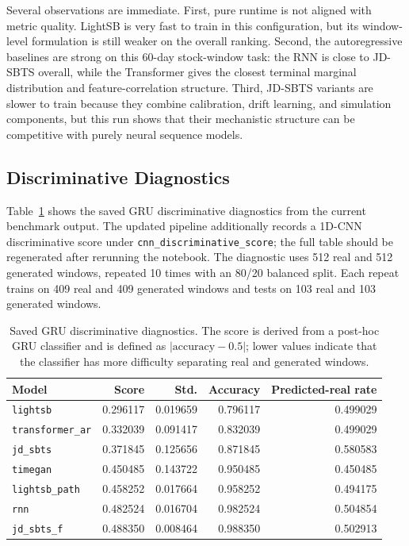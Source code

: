 \documentclass[11pt,a4paper]{article}
\begin{document}
Several observations are immediate. First, pure runtime is not aligned with
metric quality. LightSB is very fast to train in this configuration, but its
window-level formulation is still weaker on the overall ranking. Second, the
autoregressive baselines are strong on this 60-day stock-window task: the RNN
is close to JD-SBTS overall, while the Transformer gives the closest terminal
marginal distribution and feature-correlation structure. Third, JD-SBTS
variants are slower to train because they combine calibration, drift learning,
and simulation components, but this run shows that their mechanistic structure
can be competitive with purely neural sequence models.

\subsection{Discriminative Diagnostics}

Table~\ref{tab:disc} shows the saved GRU discriminative diagnostics from the
current benchmark output. The updated pipeline additionally records a 1D-CNN
discriminative score under \texttt{cnn\_discriminative\_score}; the full table
should be regenerated after rerunning the notebook. The diagnostic uses 512
real and 512 generated windows, repeated 10 times with an 80/20 balanced split.
Each repeat trains on 409 real and 409 generated windows and tests on 103 real
and 103 generated windows.

\begin{table}[H]
\centering
\caption{Saved GRU discriminative diagnostics. The score is derived from a
post-hoc GRU classifier and is defined as $|\mathrm{accuracy}-0.5|$; lower
values indicate that the classifier has more difficulty separating real and
generated windows.}
\label{tab:disc}
\begin{tabular}{lrrrr}
\toprule
Model & Score & Std. & Accuracy & Predicted-real rate \\
\midrule
\texttt{lightsb} & 0.296117 & 0.019659 & 0.796117 & 0.499029 \\
\texttt{transformer\_ar} & 0.332039 & 0.091417 & 0.832039 & 0.499029 \\
\texttt{jd\_sbts} & 0.371845 & 0.125656 & 0.871845 & 0.580583 \\
\texttt{timegan} & 0.450485 & 0.143722 & 0.950485 & 0.450485 \\
\texttt{lightsb\_path} & 0.458252 & 0.017664 & 0.958252 & 0.494175 \\
\texttt{rnn} & 0.482524 & 0.016704 & 0.982524 & 0.504854 \\
\texttt{jd\_sbts\_f} & 0.488350 & 0.008464 & 0.988350 & 0.502913 \\
\bottomrule
\end{tabular}
\end{table}
\end{document}
